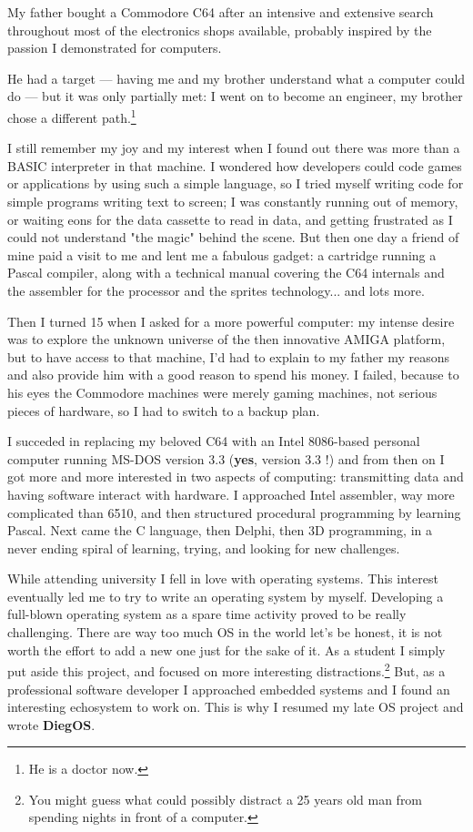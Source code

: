 \documentclass[11pt,b5paper]{scrbook}
\newcommand{\myOS}{{\color{SteelBlue}\textbf{DiegOS}}}
\begin{document}
My father bought a Commodore C64 after an intensive and extensive search throughout
most of the electronics shops
available, probably inspired by the passion I demonstrated for computers.

He had a target --- having me and my brother understand what a computer could
do --- but it was only partially met: I went on to become an engineer,
my brother chose a different path.\footnote{He is a doctor now.}

I still remember my joy and my interest when I found out there was more than
a BASIC interpreter in that machine.
I wondered how developers could code games or applications by using such a
simple language, so I tried myself writing code for simple programs writing
text to screen; I was constantly running out of memory, or waiting eons for the data cassette
to read in data, and getting frustrated as I could not understand "the magic"
behind the scene.
But then one day a friend of mine paid a visit to me and lent me a fabulous
gadget: a cartridge running a Pascal compiler, along with a technical manual
covering the C64 internals and the assembler for the processor and the sprites
technology... and lots more.

Then I turned 15 when I asked for a more powerful computer: my intense desire was
to explore the unknown universe of the then innovative AMIGA
platform, but to have access to that machine, I'd had to explain to my father my
reasons and also provide him with a good reason to spend his money. I failed,
because to his eyes the Commodore machines were merely gaming machines, not serious
pieces of hardware, so I had to switch to a backup plan.

I succeded in replacing my beloved C64 with an Intel 8086-based personal computer
running MS-DOS version 3.3 (\textbf{yes}, version 3.3 !)
and from then on I got more and more interested in two aspects of computing:
transmitting data and having software interact with hardware.
I approached Intel assembler, way more complicated than 6510, and then structured
procedural programming by learning Pascal.
Next came the C language, then Delphi, then 3D programming, in a never ending
spiral of learning, trying, and looking for new challenges.

While attending university I fell in love with operating systems.
This interest eventually led me to try to write an operating system by myself.
Developing a full-blown operating system as a spare time activity proved to be
really challenging. There are way too much
OS in the world let's be honest, it is not worth the effort to add a new one
just for the sake of it.
As a student I simply put aside this project, and focused on more interesting
distractions.\footnote{You might guess what could possibly distract a 25 years 
old man from spending nights in front of a computer.}
But, as a professional software developer I approached embedded systems and I found 
an interesting echosystem to work on.
This is why I resumed my late OS project and wrote {\myOS}.
\end{document}
